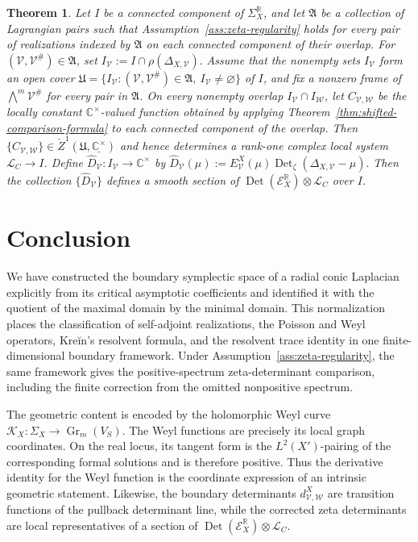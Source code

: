 \documentclass[12pt]{amsart}
\theoremstyle{plain}
\newtheorem{thm}{Theorem}[section]
\theoremstyle{definition}
\theoremstyle{remark}
\numberwithin{equation}{section} \numberwithin{figure}{section}
\renewcommand*{\to}{\rightarrow}
\newcommand{\mb}[1]{\mathbb{#1}} %
\newcommand{\mc}[1]{\mathcal{#1}}
\begin{document}
\begin{thm}\label{thm:zeta-determinant-section}
Let \(I\) be a connected component of \(\Sigma_X^{\mb R}\), and let
\(\mathfrak A\) be a collection of Lagrangian pairs such that
Assumption~\ref{ass:zeta-regularity} holds for every pair of
realizations indexed by \(\mathfrak A\) on each connected component
of their overlap. For \((\mc V,\mc V^\#)\in\mathfrak A\), set
\(
    I_{\mc V}:=I\cap\rho(\Delta_{X,\mc V}).
\)
Assume that the nonempty sets \(I_{\mc V}\) form an open cover
\(
\mathfrak U=
\{I_{\mc V}:(\mc V,\mc V^\#)\in\mathfrak A,\
I_{\mc V}\neq\varnothing\}
\)
of \(I\), and fix a nonzero frame of
\(\bigwedge^m\mc V^\#\) for every pair in \(\mathfrak A\).
On every nonempty overlap \(I_{\mc V}\cap I_{\mc W}\), let
\(C_{\mc V,\mc W}\) be the locally constant
\(\mb C^\times\)-valued function obtained by applying
Theorem~\ref{thm:shifted-comparison-formula} to each connected
component of the overlap. Then
\(
    \{C_{\mc V,\mc W}\}
    \in
    \check Z^1(\mathfrak U,\underline{\mb C^\times})
\)
and hence determines a rank-one complex local system
\(\mc L_C\to I\). Define
\(
    \widehat D_{\mc V}:I_{\mc V}\to\mb C^\times
\)
by
\(
    \widehat D_{\mc V}(\mu)
    :=
    E_{\mc V}^X(\mu)
    \operatorname{Det}_{\zeta}
    (\Delta_{X,\mc V}-\mu).
\)
Then the collection \(\{\widehat D_{\mc V}\}\) defines a smooth
section of
\(
    \operatorname{Det}(\mc E_X^{\mb R})
    \otimes
    \mc L_C
\)
over \(I\).
\end{thm}



\section{Conclusion}

We have constructed the boundary symplectic space of a radial conic
Laplacian explicitly from its critical asymptotic coefficients and
identified it with the quotient of the maximal domain by the minimal
domain. This normalization places
the classification of self-adjoint realizations, the Poisson and Weyl
operators, Kreĭn's resolvent formula, and the resolvent trace identity
in one finite-dimensional boundary framework. Under
Assumption~\ref{ass:zeta-regularity}, the same framework gives the
positive-spectrum zeta-determinant comparison, including the finite
correction from the omitted nonpositive spectrum.

The geometric content is encoded by the holomorphic Weyl curve
\(\mc K_X:\Sigma_X\to\operatorname{Gr}_m(V_S)\). The Weyl functions
are precisely its local graph coordinates. On the real locus, its
tangent form is the \(L^2(X')\)-pairing of the corresponding formal
solutions and is therefore positive. Thus the derivative identity for
the Weyl function is the coordinate expression of an intrinsic
geometric statement. Likewise, the boundary determinants
\(d_{\mc V,\mc W}^X\) are transition functions of the pullback
determinant line, while the corrected zeta determinants are local
representatives of a section of
\(\operatorname{Det}(\mc E_X^{\mb R})\otimes\mc L_C\).
\end{document}
